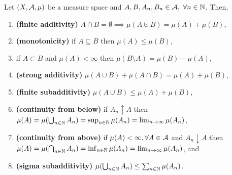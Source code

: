 \begin{thm}
	\label{thm:prop-measures}
	Let $(X, \mathcal{A}, \mu)$ be a measure space and $A, B, A_n, B_n \in \mathcal{A},\ \forall n \in \mathbb{N}$. Then,
	\begin{enumerate}
		\item \textbf{(finite additivity)} $A \cap B = \emptyset \implies \mu(A \cupdot B) = \mu(A) + \mu(B)$,
		\item \textbf{(monotonicity)} if $A \subseteq B$ then $\mu(A) \leq \mu(B)$,
		\item if $A \subset B$ and $\mu(A) < \infty$ then $\mu(B\setminus A) = \mu(B) - \mu(A)$,
		\item \textbf{(strong additivity)} $\mu(A \cup B) + \mu(A \cap B) = \mu(A) + \mu(B)$,
		\item \textbf{(finite subadditivity)} $\mu(A \cup B) \leq \mu(A) + \mu(B)$,
		\item \textbf{(continuity from below)} if $A_n \uparrow A$ then $\mu(A) = \mu(\bigcup_{n \in \mathbb{N}} A_n) = \sup_{n\in\mathbb{N}} \mu(A_n) = \lim_{n\to \infty} \mu(A_n)$,
		\item \textbf{(continuity from above)} if $\mu(A) < \infty, \forall A \in \mathcal{A}$ and $A_n \downarrow A$ then $\mu(A) = \mu(\bigcap_{n \in \mathbb{N}} A_n) = \inf_{n\in\mathbb{N}} \mu(A_n) = \lim_{n\to \infty} \mu(A_n)$, and
		\item \textbf{(sigma subadditivity)} $\mu(\bigcup_{n \in \mathbb{N}} A_n) \leq \sum_{n\in \mathbb{N}} \mu(A_n)$.
	\end{enumerate}
\end{thm}

